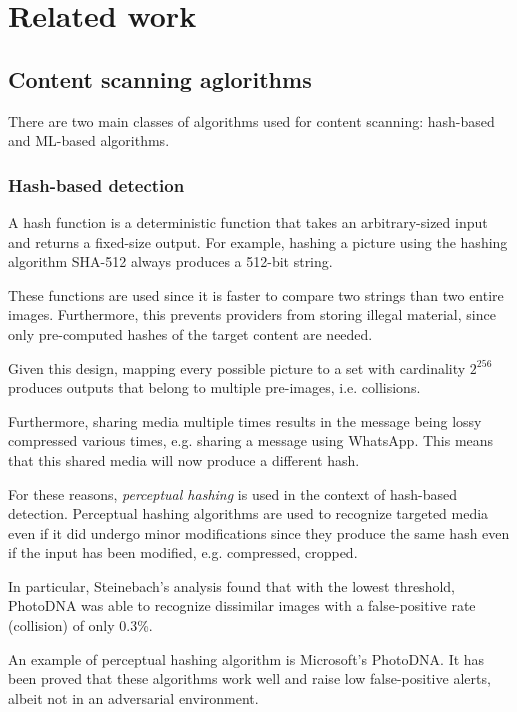 \section{Related work}

\subsection{Content scanning aglorithms}
\label{ss:det_algo}

There are two main classes of algorithms used for content scanning: hash-based and ML-based algorithms\cite{abelson2024bugs}. 

\subsubsection{Hash-based detection}

A hash function is a deterministic function that takes an arbitrary-sized input and returns a fixed-size output. For example, hashing a picture using the hashing algorithm SHA-512 always produces a 512-bit string. 

These functions are used since it is faster to compare two strings than two entire images. Furthermore, this prevents providers from storing illegal material, since only pre-computed hashes of the target content are needed\cite{abelson2024bugs}. 

Given this design, mapping every possible picture to a set with cardinality $2^{256}$ produces outputs that belong to multiple pre-images, i.e. collisions. 

Furthermore, sharing media multiple times results in the message being lossy compressed various times, e.g. sharing a message using WhatsApp. This means that this shared media will now produce a different hash. 

For these reasons, \textit{perceptual hashing} is used in the context of hash-based detection\cite{abelson2024bugs}. Perceptual hashing algorithms are used to recognize targeted media even if it did undergo minor modifications since they produce the same hash even if the input has been modified, e.g. compressed, cropped\cite{abelson2024bugs}.

In particular, Steinebach's analysis found that with the lowest threshold, PhotoDNA was able to recognize dissimilar images with a false-positive rate (collision) of only 0.3\%.

An example of perceptual hashing algorithm is Microsoft's PhotoDNA. It has been proved that these algorithms work well and raise low false-positive alerts\cite{steinebach2023analysis}, albeit not in an adversarial environment\cite{prokos2021squint}.

